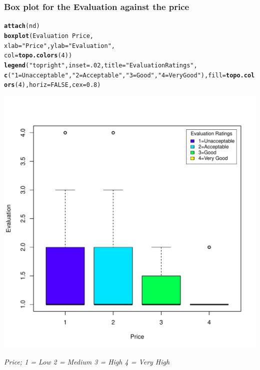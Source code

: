 \documentclass{article}\usepackage[]{graphicx}\usepackage[]{color}
\makeatletter
\def\maxwidth{ %
  \ifdim\Gin@nat@width>\linewidth
    \linewidth
  \else
    \Gin@nat@width
  \fi
}
\newcommand{\hlnum}[1]{\textcolor[rgb]{0.686,0.059,0.569}{#1}}%
\newcommand{\hlstr}[1]{\textcolor[rgb]{0.192,0.494,0.8}{#1}}%
\newcommand{\hlopt}[1]{\textcolor[rgb]{0,0,0}{#1}}%
\newcommand{\hlstd}[1]{\textcolor[rgb]{0.345,0.345,0.345}{#1}}%
\newcommand{\hlkwc}[1]{\textcolor[rgb]{0.333,0.667,0.333}{#1}}%
\newcommand{\hlkwd}[1]{\textcolor[rgb]{0.737,0.353,0.396}{\textbf{#1}}}%
\newenvironment{kframe}{%
 \def\at@end@of@kframe{}%
 \ifinner\ifhmode%
  \def\at@end@of@kframe{\end{minipage}}%
  \begin{minipage}{\columnwidth}%
 \fi\fi%
 \def\FrameCommand##1{\hskip\@totalleftmargin \hskip-\fboxsep
 \colorbox{shadecolor}{##1}\hskip-\fboxsep
     \hskip-\linewidth \hskip-\@totalleftmargin \hskip\columnwidth}%
 \MakeFramed {\advance\hsize-\width
   \@totalleftmargin\z@ \linewidth\hsize
   \@setminipage}}%
 {\par\unskip\endMakeFramed%
 \at@end@of@kframe}
\newenvironment{knitrout}{}{} %
\makeatother
\begin{document}
\subsubsection*{Box plot for the Evaluation against the price}
\begin{knitrout}
\color{fgcolor}\begin{kframe}
\begin{alltt}
\hlkwd{attach}\hlstd{(nd)}
\hlkwd{boxplot}\hlstd{(Evaluation} \hlopt{~} \hlstd{Price,}
        \hlkwc{xlab}\hlstd{=}\hlstr{"Price"}\hlstd{,}\hlkwc{ylab}\hlstd{=}\hlstr{"Evaluation"}\hlstd{,}
        \hlkwc{col}\hlstd{=}\hlkwd{topo.colors}\hlstd{(}\hlnum{4}\hlstd{))}
\hlkwd{legend}\hlstd{(}\hlstr{"topright"}\hlstd{,} \hlkwc{inset}\hlstd{=}\hlnum{.02}\hlstd{,} \hlkwc{title}\hlstd{=}\hlstr{"Evaluation Ratings"}\hlstd{,}
   \hlkwd{c}\hlstd{(}\hlstr{"1=Unacceptable"}\hlstd{,}\hlstr{"2=Acceptable"}\hlstd{,}\hlstr{"3=Good"}\hlstd{,}\hlstr{"4=Very Good"}\hlstd{),} \hlkwc{fill}\hlstd{=}\hlkwd{topo.colors}\hlstd{(}\hlnum{4}\hlstd{),} \hlkwc{horiz}\hlstd{=}\hlnum{FALSE}\hlstd{,} \hlkwc{cex}\hlstd{=}\hlnum{0.8}\hlstd{)}
\end{alltt}
\end{kframe}
\includegraphics[width=\maxwidth]{figure/unnamed-chunk-7-1} 

\end{knitrout}
\emph{Price; 1 = Low 2 = Medium 3 = High 4 = Very High} 
\end{document}
